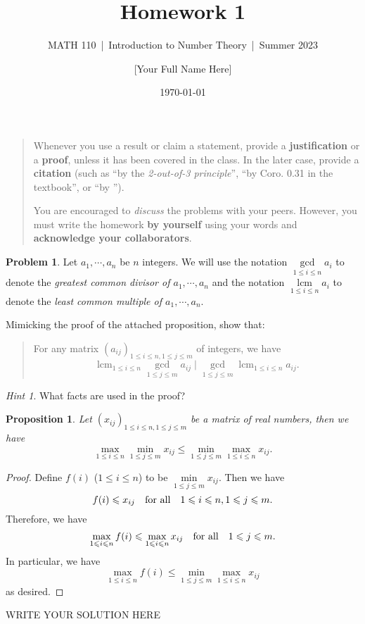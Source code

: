 \documentclass[11pt]{article}
\title{Homework 1}
\author{[Your Full Name Here]}
\subtitle{MATH 110~|~Introduction to Number Theory~|~Summer 2023}
\date{\today}
\theoremstyle{plain}
\newtheorem*{propstar}{Proposition}
\theoremstyle{definition}
\newtheorem{problem}{Problem}
\theoremstyle{remark}
\newtheorem*{hint}{Hint}
\numberwithin{equation}{problem}
\DeclareMathOperator*\lcm{lcm}
\begin{document}
\maketitle

\begin{quotation}
	Whenever you use a result or claim a statement, provide a \textbf{justification} or a \textbf{proof}, unless it has been covered in the class. In the later case, provide a \textbf{citation} (such as ``by the \emph{2-out-of-3 principle}'', ``by Coro. 0.31 in the textbook'', or ``by \cite[Coro. 0.31]{texbook}'').

	You are encouraged to \emph{discuss} the problems with your peers. However, you must write the homework \textbf{by yourself} using your words and \textbf{acknowledge your collaborators}.
\end{quotation}



\begin{problem}
	Let $a_1,\cdots,a_n$ be $n$ integers. We will use the notation $\gcd\limits_{1\le i\le n}a_i$ to denote the \emph{greatest common divisor of $a_1,\cdots,a_n$} and the notation $\lcm\limits_{1\le i\le n}a_i$ to denote the \emph{least common multiple of $a_1,\cdots,a_n$}. 
	
	
	Mimicking the proof of the attached proposition, show that: 
	\begin{quote}
		For any matrix $(a_{ij})_{1\le i\le n, 1\le j\le m}$ of integers, we have 
		\[
			\lcm_{1\le i\le n}\gcd_{1\le j\le m} a_{ij} \mid 
			\gcd_{1\le j\le m}\lcm_{1\le i\le n} a_{ij}.
		\]
	\end{quote}
	\begin{hint}
		What facts are used in the proof?
	\end{hint}
	\begin{tcolorbox}
		\begin{propstar}\label{prop}
			Let $(x_{ij})_{1\le i\le n, 1\le j\le m}$ be a matrix of real numbers, then we have 
			\[
				\max_{1\le i\le n}\min_{1\le j\le m} x_{ij} \le 
				\min_{1\le j\le m}\max_{1\le i\le n} x_{ij}.
			\]
		\end{propstar}
		\begin{proof}
			Define $f(i)$ ($1\le i\le n$) to be $\min\limits_{1\le j\le m}x_{ij}$. Then we have 
			\[
				f(i) \leqslant x_{ij} \quad\text{for all}\quad 1\leqslant i\leqslant n, 1\leqslant j\leqslant m.
			\]
			Therefore, we have 
			\[
				\max_{1\leqslant i\leqslant n}f(i) \leqslant \max_{1\leqslant i\leqslant n} x_{ij} 
				\quad\text{for all}\quad 1\leqslant j\leqslant m.
			\]
			In particular, we have 
			\[
				\max_{1\le i\le n}f(i) \le \min_{1\le j\le m}\max_{1\le i\le n} x_{ij}
			\]
			as desired.
		\end{proof}
	\end{tcolorbox}
\end{problem}
\begin{solution} %
WRITE YOUR SOLUTION HERE
\end{solution}\clearpage %
\end{document}
